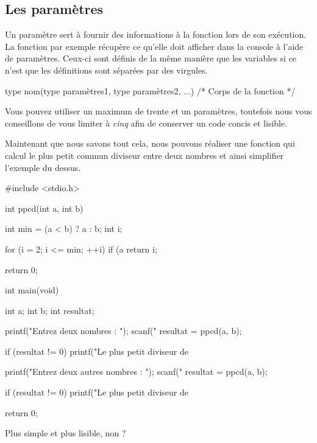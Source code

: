 \subsection{Les paramètres}
\label{les-parametres}

Un paramètre sert à fournir des informations à la fonction lors de son
exécution. La fonction  par exemple récupère ce qu'elle
doit afficher dans la console à l'aide de paramètres. Ceux-ci sont
définis de la même manière que les variables si ce n'est que les
définitions sont séparées par des virgules.

\begin{C}
type nom(type paramètres1, type paramètres2, ...)
{
    /* Corps de la fonction */
}
\end{C}

\begin{infobox}
  Vous pouvez utiliser un maximum de
trente et un paramètres, toutefois nous vous conseillons de vous limiter
à \emph{cinq} afin de conserver un code concis et lisible.
\end{infobox}


Maintenant que nous savons tout cela, nous pouvons réaliser une fonction
qui calcul le plus petit commun diviseur entre deux nombres et ainsi
simplifier l'exemple du dessus.

\begin{C}
#include <stdio.h>


int ppcd(int a, int b)
{
    int min = (a < b) ? a : b;
    int i;

    for (i = 2; i <= min; ++i)
        if (a %
            return i;

    return 0;
}


int main(void)
{
    int a;
    int b;
    int resultat;

    printf("Entrez deux nombres : ");
    scanf("%
    resultat = ppcd(a, b);

    if (resultat != 0)
        printf("Le plus petit diviseur de %

    printf("Entrez deux autres nombres : ");
    scanf("%
    resultat = ppcd(a, b);

    if (resultat != 0)
        printf("Le plus petit diviseur de %

    return 0;
}
\end{C}

Plus simple et plus lisible, non ?

